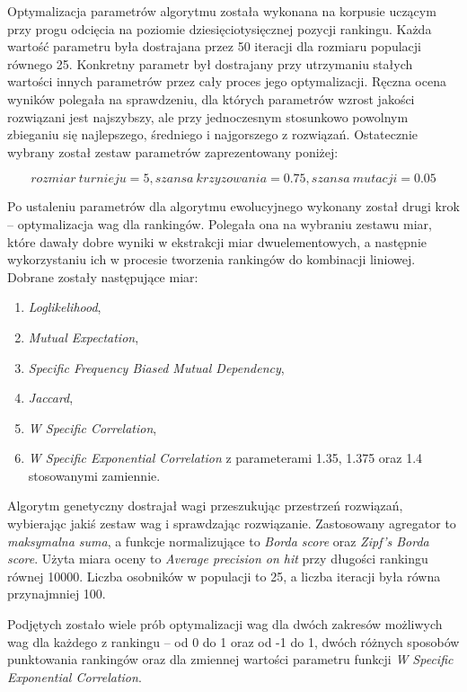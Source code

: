 Optymalizacja parametrów algorytmu została wykonana na korpusie uczącym przy progu odcięcia na poziomie dziesięciotysięcznej pozycji rankingu.
Każda wartość parametru była dostrajana przez 50 iteracji dla rozmiaru populacji równego 25.
Konkretny parametr był dostrajany przy utrzymaniu stałych wartości innych parametrów przez cały proces jego optymalizacji.
Ręczna ocena wyników polegała na sprawdzeniu, dla których parametrów wzrost jakości rozwiązani jest najszybszy, ale przy jednoczesnym stosunkowo powolnym zbieganiu się najlepszego, średniego i najgorszego z rozwiązań.
Ostatecznie wybrany został zestaw parametrów zaprezentowany poniżej:

$$ rozmiar \: turnieju = 5, szansa \: krzyzowania = 0.75, szansa \: mutacji = 0.05 $$

\par
Po ustaleniu parametrów dla algorytmu ewolucyjnego wykonany został drugi krok -- optymalizacja wag dla rankingów.
Polegała ona na wybraniu zestawu miar, które dawały dobre wyniki w ekstrakcji miar dwuelementowych, a następnie wykorzystaniu ich w procesie tworzenia rankingów do kombinacji liniowej.
Dobrane zostały następujące miar:
\begin{enumerate}
	\item \emph{Loglikelihood},
	\item \emph{Mutual Expectation},
	\item \emph{Specific Frequency Biased Mutual Dependency},
	\item \emph{Jaccard},
	\item \emph{W Specific Correlation},
	\item \emph{W Specific Exponential Correlation} z parameterami 1.35, 1.375 oraz 1.4 stosowanymi zamiennie.
\end{enumerate}

\par
Algorytm genetyczny dostrajał wagi przeszukując przestrzeń rozwiązań, wybierając jakiś zestaw wag i sprawdzając rozwiązanie.
Zastosowany agregator to \emph{maksymalna suma}, a funkcje normalizujące to \emph{Borda score} oraz \emph{Zipf's Borda score}.
Użyta miara oceny to \emph{Average precision on hit} przy długości rankingu równej 10000.
Liczba osobników w populacji to 25, a liczba iteracji była równa przynajmniej 100.

\par
Podjętych zostało wiele prób optymalizacji wag dla dwóch zakresów możliwych wag dla każdego z rankingu -- od 0 do 1 oraz od -1 do 1, dwóch różnych sposobów punktowania rankingów oraz dla zmiennej wartości parametru funkcji \emph{W Specific Exponential Correlation}.


